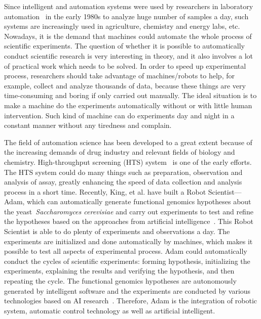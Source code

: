 Since intelligent and automation systems were used by researchers in laboratory automation~\cite{Sasaki_1998} in the early 1980s to analyze huge number of samples a day, such systems are increasingly used in agriculture, chemistry and energy labs, etc. Nowadays, it is the demand that machines could automate the whole process of scientific experiments. The question of whether it is possible to automatically conduct scientific research is very interesting in theory, and it also involves a lot of practical work which needs to be solved. In order to speed up experimental process, researchers should take advantage of machines/robots to help, for example, collect and analyze thousands of data, because these things are very time-consuming and boring if only carried out manually. The ideal situation is to make a machine do the experiments automatically without or with little human intervention. Such kind of machine can do experiments day and night in a constant manner without any tiredness and complain.
          
The field of automation science has been developed to a great extent because of the increasing demands of drug industry and relevant fields of biology and chemistry. High-throughput screening (HTS) system~\cite{Persidis_1998} is one of the early efforts. The HTS system could do many things such as preparation, observation and analysis of assay, greatly enhancing the speed of data collection and analysis process in a short time. Recently, King, et al. have built a Robot Scientist---Adam,  which can automatically generate functional genomics hypotheses about the yeast~\textit{Saccharomyces cerevisiae} and carry out experiments to test and refine the hypotheses based on the approaches from artificial intelligence~\cite{King_2004, King_2009}. This Robot Scientist is able to do plenty of experiments and observations a day. The experiments are initialized and done automatically by machines, which makes it possible to test all aspects of experimental process. Adam could automatically conduct the cycles of scientific experiments: forming hypothesis, initializing the experiments, explaining the results and verifying the hypothesis, and then repeating the cycle. The functional genomics hypotheses are autonomously generated by intelligent software and the experiments are conducted by various technologies based on AI research~\cite{King_2004}. Therefore, Adam is the integration of robotic system, automatic control technology as well as artificial intelligent. 

